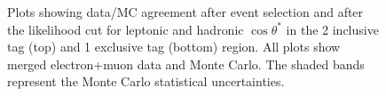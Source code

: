 \begin{figure}[!hb]
\begin{center}
    \caption{Plots showing data/MC agreement after event selection and after the likelihood cut for leptonic and hadronic $\cos\theta^*$ in the 2 inclusive \bt tag (top) and 1 exclusive \bt tag (bottom) region. All plots show merged electron+muon data and Monte Carlo. The shaded bands represent the Monte Carlo statistical uncertainties.}
    \label{fig:control_plots_costheta}
  \end{center}
\end{figure}
\clearpage